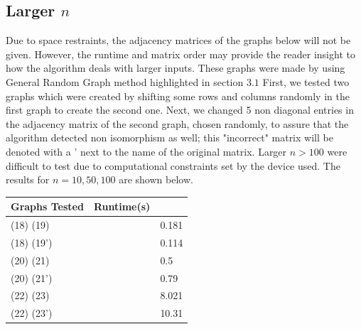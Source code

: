 \documentclass[12pt]{article}
\begin{document}
\subsection{Larger $n$}
Due to space restraints, the adjacency matrices of the graphs below will not be given. However, the runtime and matrix order may provide the reader insight to how the algorithm deals with larger inputs. These graphs were made by using General Random Graph method highlighted in section $3.1$
First, we tested two graphs which were created by shifting some rows and columns randomly in the first graph to create the second one. Next, we changed 5 non diagonal entries in the adjacency matrix of the second graph, chosen randomly, to assure that the algorithm detected non isomorphism as well; this "incorrect" matrix will be denoted with a ' next to the name of the original matrix. Larger $n>100$ were difficult to test due to computational constraints set by the device used. The results for $n = 10, 50, 100$ are shown below.
\begin{center}
    \begin{tabular}{ | l | l p{5cm} |}
   \hline
    Graphs Tested & Runtime(s) \\  \hline 
    (18) (19) & & 0.181\\ \hline
    (18) (19') & & 0.114\\ \hline
    (20) (21) & & 0.5\\ \hline
    (20) (21') & & 0.79\\ \hline
    (22) (23) & & 8.021\\ \hline
    (22) (23') & & 10.31\\ \hline
    \hline
    \end{tabular}
\end{center}
\end{document}
